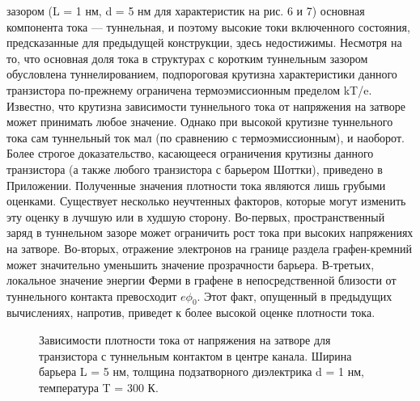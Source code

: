 \documentclass[a4paper,12pt]{article} %
\begin{document}
зазором (L = 1 нм, d = 5 нм для характеристик на рис. 6 и 7) основная компонента тока — туннельная, и поэтому высокие токи включенного состояния, предсказанные для предыдущей конструкции, здесь недостижимы. Несмотря на то, что основная доля тока в структурах с коротким туннельным зазором обусловлена туннелированием, подпороговая крутизна характеристики данного транзистора по-прежнему ограничена термоэмиссионным пределом kT/e. Известно, что крутизна зависимости туннельного тока от напряжения на затворе может принимать любое значение. Однако при высокой крутизне туннельного тока сам туннельный ток мал (по сравнению с термоэмиссионным), и наоборот. Более строгое доказательство, касающееся ограничения крутизны данного транзистора (а также любого транзистора с барьером Шоттки), приведено в Приложении. Полученные значения плотности тока являются лишь грубыми оценками. Существует несколько неучтенных факторов, которые могут изменить эту оценку в лучшую или в худшую сторону. Во-первых, пространственный заряд в туннельном зазоре может ограничить рост тока при высоких напряжениях на затворе. Во-вторых, отражение электронов на границе раздела графен-кремний может значительно уменьшить значение прозрачности барьера. В-третьих, локальное значение энергии Ферми в графене в непосредственной близости от туннельного контакта превосходит $e\phi_0$. Этот факт, опущенный в предыдущих вычислениях, напротив, приведет к более высокой оценке плотности тока.

\begin{figure}[h!]
\caption{ Зависимости плотности тока от напряжения на затворе для транзистора с туннельным контактом в центре канала. Ширина барьера L = 5 нм, толщина подзатворного диэлектрика d = 1 нм, температура T = 300 К.}
\end{figure}
\end{document}
